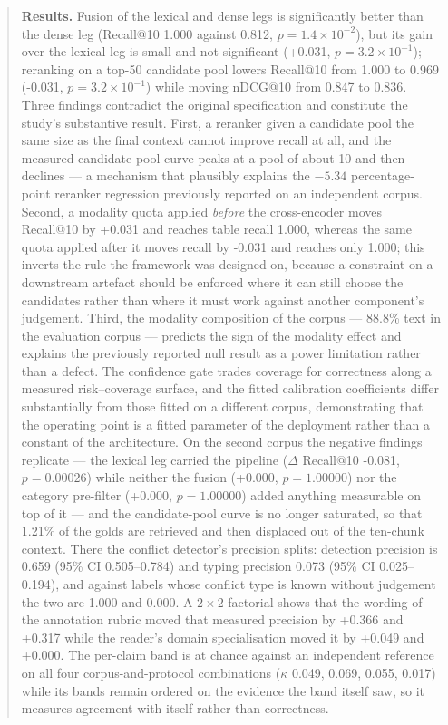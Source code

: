 \documentclass[preprint,3p,times]{elsarticle}
\begin{document}
\begin{abstract}
\textbf{Results.} Fusion of the lexical and dense legs is significantly better
than the dense leg (Recall@10 1.000 against 0.812, $p=1.4\!\times\!10^{-2}$), but
its gain over the lexical leg is small and not significant (+0.031,
$p=3.2\!\times\!10^{-1}$); reranking on a top-50 candidate pool lowers Recall@10 from
1.000 to 0.969 (-0.031, $p=3.2\!\times\!10^{-1}$) while moving nDCG@10 from
0.847 to 0.836. Three findings contradict the original specification
and constitute
the study's substantive result. First, a reranker given a candidate pool the
same size as the final context cannot improve recall at all, and the measured
candidate-pool curve peaks at a pool of about 10 and then declines
--- a mechanism that plausibly explains the $-5.34$ percentage-point reranker
regression previously reported on an independent corpus. Second, a modality
quota applied \emph{before} the cross-encoder moves Recall@10 by
+0.031 and reaches table recall 1.000, whereas the same quota
applied after it moves recall by -0.031 and reaches only
1.000; this inverts the rule the framework was designed on, because a
constraint on a downstream artefact should be enforced where it can still
choose the candidates rather than where it must work against another
component's judgement. Third, the
modality composition of the corpus --- 88.8\% text in the evaluation corpus ---
predicts the sign of the modality effect and explains the previously reported
null result as a power limitation rather than a defect. The confidence gate
trades coverage for correctness along a measured risk--coverage surface, and
the fitted calibration coefficients differ substantially from those fitted on a
different corpus, demonstrating that the operating point is a fitted parameter
of the deployment rather than a constant of the architecture. On the second
corpus the negative findings replicate --- the lexical leg carried the pipeline
($\Delta$ Recall@10 -0.081, $p=0.00026$) while
neither the fusion (+0.000, $p=1.00000$)
nor the category pre-filter (+0.000,
$p=1.00000$) added anything measurable on top of it --- and
the candidate-pool curve is no longer saturated, so that
1.21\% of the golds are retrieved and then displaced out
of the ten-chunk context. There the conflict detector's precision splits:
detection precision is 0.659 (95\% CI 0.505--0.784)
and typing precision 0.073 (95\% CI 0.025--0.194),
and against labels whose conflict type is known without judgement the two are
1.000 and 0.000. A
$2\times2$ factorial shows that the wording of the annotation rubric moved
that measured precision by +0.366 and
+0.317 while the reader's domain specialisation moved
it by +0.049 and +0.000. The per-claim band
is at chance against an independent reference on all four
corpus-and-protocol combinations ($\kappa$ 0.049,
0.069, 0.055, 0.017)
while its bands remain ordered on the evidence the band itself saw, so it
measures agreement with itself rather than correctness.


\end{abstract}
\end{document}
